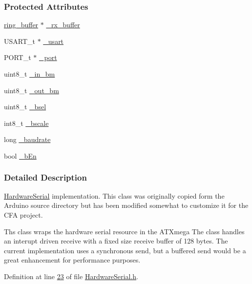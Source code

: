 \subsubsection*{Protected Attributes}
\begin{DoxyCompactItemize}
\item 
\hyperlink{structring__buffer}{ring\_\-buffer} $\ast$ \hyperlink{class_hardware_serial_a9ee5f8b61e049f98dfd0b5ae53e97273}{\_\-rx\_\-buffer}
\item 
USART\_\-t $\ast$ \hyperlink{class_hardware_serial_a3a3bd56aa561ae7e1eb1fd252b5b69a0}{\_\-usart}
\item 
PORT\_\-t $\ast$ \hyperlink{class_hardware_serial_add54c7d986c6122e8e8c23303f5b4845}{\_\-port}
\item 
uint8\_\-t \hyperlink{class_hardware_serial_a8724fdfd3955eeff5d3ed535624ce79a}{\_\-in\_\-bm}
\item 
uint8\_\-t \hyperlink{class_hardware_serial_a751a284e15af72b026143a8091be1b70}{\_\-out\_\-bm}
\item 
uint8\_\-t \hyperlink{class_hardware_serial_acc6c13c76a56c8b4bb88c3385b7bc791}{\_\-bsel}
\item 
int8\_\-t \hyperlink{class_hardware_serial_a37dd406c01fd6432618925f0aeb329f3}{\_\-bscale}
\item 
long \hyperlink{class_hardware_serial_ae692ab4a0a8aad73c74a10066fa9da24}{\_\-baudrate}
\item 
bool \hyperlink{class_hardware_serial_a8040fbab1f9197a9935df23a4c5e9a3b}{\_\-bEn}
\end{DoxyCompactItemize}


\subsubsection{Detailed Description}
\hyperlink{class_hardware_serial}{HardwareSerial} implementation. This class was originally copied form the Arduino source directory but has been modified somewhat to customize it for the CFA project.

Ths class wraps the hardware serial resource in the ATXmega The class handles an interupt driven receive with a fixed size receive buffer of 128 bytes. The current implementation uses a synchronous send, but a buffered send would be a great enhancement for performance purposes. 

Definition at line \hyperlink{_hardware_serial_8h_source_l00023}{23} of file \hyperlink{_hardware_serial_8h_source}{HardwareSerial.h}.




